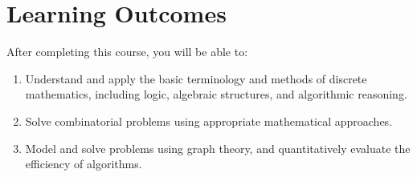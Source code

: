 \documentclass[11pt,a4paper]{article}
\begin{document}
\section{Learning Outcomes}
After completing this course, you will be able to:
\begin{enumerate}[label=LO\arabic*.]
  \item Understand and apply the basic terminology and methods of discrete
        mathematics, including logic, algebraic structures, and algorithmic
        reasoning.
  \item Solve combinatorial problems using appropriate mathematical approaches.
  \item Model and solve problems using graph theory, and quantitatively evaluate
        the efficiency of algorithms.
\end{enumerate}
\end{document}
